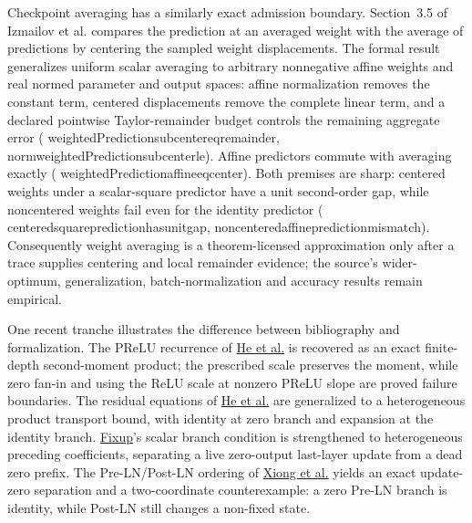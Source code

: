 \documentclass[11pt]{article}
\newcommand{\leanname}[1]{{\scriptsize\ttfamily
  \def\_{\textunderscore\allowbreak}#1}}
\begin{document}
Checkpoint averaging has a similarly exact admission boundary.  Section~3.5
of Izmailov et al. \cite{izmailov2018swa} compares the prediction at an averaged
weight with the average of predictions by centering the sampled weight
displacements.  The formal result generalizes uniform scalar averaging to
arbitrary nonnegative affine weights and real normed parameter and output
spaces: affine normalization removes the constant term, centered displacements
remove the complete linear term, and a declared pointwise Taylor-remainder
budget controls the remaining aggregate error
(\leanname{weightedPrediction\_sub\_center\_eq\_remainder},
\leanname{norm\_weightedPrediction\_sub\_center\_le}).
Affine predictors commute with averaging exactly
(\leanname{weightedPrediction\_affine\_eq\_center}).  Both premises are sharp:
centered weights under a scalar-square predictor have a unit second-order gap,
while noncentered weights fail even for the identity predictor
(\leanname{centered\_square\_prediction\_has\_unit\_gap},
\leanname{noncentered\_affine\_prediction\_mismatch}).  Consequently
weight averaging is a theorem-licensed approximation only after a trace
supplies centering and local remainder evidence; the source's wider-optimum,
generalization, batch-normalization and accuracy results remain empirical.

One recent tranche illustrates the difference between bibliography and formalization.
The PReLU recurrence of
\href{https://arxiv.org/abs/1502.01852}{He et al.} is recovered as an exact finite-depth
second-moment product; the prescribed scale preserves the moment, while zero fan-in and
using the ReLU scale at nonzero PReLU slope are proved failure boundaries. The residual
equations of \href{https://arxiv.org/abs/1512.03385}{He et al.} are generalized to a
heterogeneous product transport bound, with identity at zero branch and expansion at the
identity branch. \href{https://arxiv.org/abs/1901.09321}{Fixup}'s scalar branch
condition is strengthened to heterogeneous preceding coefficients, separating a live
zero-output last-layer update from a dead zero prefix. The Pre-LN/Post-LN ordering of
\href{https://arxiv.org/abs/2002.04745}{Xiong et al.} yields an exact update-zero
separation and a two-coordinate counterexample: a zero Pre-LN branch is identity, while
Post-LN still changes a non-fixed state.
\end{document}
